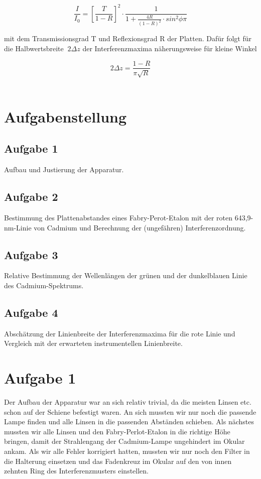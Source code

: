 \documentclass{article}
\begin{document}
\begin{equation}
\label{10}
\frac {I}{I_{0}} = \left [ \frac {T}{1-R} \right ]^2 \cdot \frac {1}{1+ \frac {4R}{(1-R)^2} \cdot sin^2 \phi \pi}
\end{equation}

mit dem Transmissionsgrad T und Reflexionsgrad R der Platten. Dafür folgt für die Halbwertsbreite \(\ 2 \Delta z \) der Interferenzmaxima näherungsweise für kleine Winkel

\begin{equation}
\label{11}
2 \Delta z= \frac {1-R}{\pi \sqrt {R}}
\end{equation}\\

\section{Aufgabenstellung}
\subsection*{Aufgabe 1}
Aufbau und Justierung der Apparatur.
\subsection*{Aufgabe 2}
Bestimmung des Plattenabstandes eines {\sc  Fabry-Perot-Etalon} mit der roten 643,9-nm-Linie von Cadmium und Berechnung der (ungefähren) Interferenzordnung.
\subsection*{Aufgabe 3}
Relative Bestimmung der Wellenlängen der grünen und der dunkelblauen Linie des Cadmium-Spektrums.
\subsection*{Aufgabe 4}
Abschätzung der Linienbreite der Interferenzmaxima für die rote Linie und Vergleich mit der erwarteten instrumentellen Linienbreite.

\newpage

\section{Aufgabe 1}
Der Aufbau der Apparatur war an sich relativ trivial, da die meisten Linsen etc. schon auf der Schiene befestigt waren. An sich mussten wir nur noch die passende Lampe finden und alle Linsen in die passenden Abständen schieben. Als nächstes mussten wir alle Linsen und den Fabry-Perlot-Etalon in die richtige Höhe bringen, damit der Strahlengang der Cadmium-Lampe ungehindert im Okular ankam. Als wir alle Fehler korrigiert hatten, mussten wir nur noch den Filter in die Halterung einsetzen und das Fadenkreuz im Okular auf den von innen zehnten Ring des Interferenzmusters einstellen.
\end{document}
